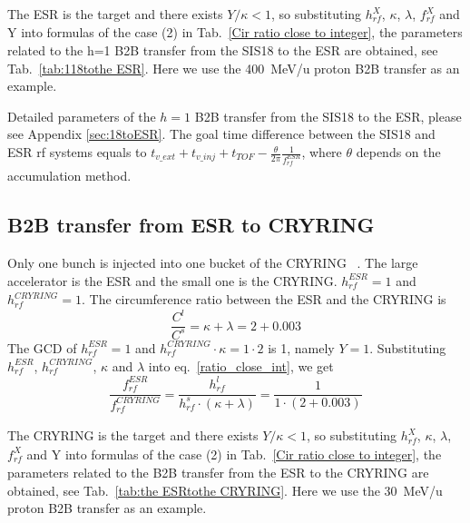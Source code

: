 The ESR is the target and there exists $Y/\kappa<1$, so substituting $h^X_\mathit{rf}$, $\kappa$, $\lambda$, $f_{\mathit{rf}}^{X}$ and Y into formulas of the case (2) in Tab.~\ref{Cir ratio close to integer}, the parameters related to the h=1 B2B transfer from the SIS18 to the ESR are obtained, see Tab.~\ref{tab:118tothe ESR}. Here we use the \SI{400}{MeV/\atomicmassunit} proton B2B transfer as an example. 



Detailed parameters of the $h=1$ B2B transfer from the SIS18 to the ESR, please see Appendix \ref{sec:18toESR}. The goal time difference between the SIS18 and ESR rf systems equals to $t_{v\_ext}+t_{v\_inj}+t_{TOF}-\frac{\theta}{2\pi}\frac{1}{f_\mathit{rf}^\mathit{ESR}}$, where $\theta$ depends on the accumulation method.

\subsection{B2B transfer from ESR to CRYRING}
Only one bunch is injected into one bucket of the CRYRING ~\cite{herfurth_low_2013, lestinsky_cryring_2015}. The large accelerator is the ESR and the small one is the CRYRING. $h^{\mathit{ESR}}_\mathit{rf}=1$ and $h^{\mathit{CRYRING}}_\mathit{rf}=1$. The circumference ratio between the ESR and the CRYRING is
\begin{equation}
\frac{C^l}{C^s}=\kappa + \lambda =2+0.003
\end{equation}
The GCD of $h^{\mathit{ESR}}_\mathit{rf}=1$ and $h^{\mathit{CRYRING}}_\mathit{rf} \cdot \kappa=1\cdot 2$ is 1, namely $Y=1$. Substituting $h^{\mathit{ESR}}_\mathit{rf}$, $h^{\mathit{CRYRING}}_\mathit{rf}$, $\kappa$ and $\lambda$ into eq.~\ref{ratio_close_int}, we get
\begin{equation}
\frac {f_{\mathit{rf}}^{\mathit{ESR}}}{f_{\mathit{rf}}^{\mathit{CRYRING}}}= \frac{h^l_\mathit{rf}}{h^s_\mathit{rf} \cdot (\kappa+ \lambda)}=\frac {1}{1 \cdot(2+0.003)}
\end{equation}

The CRYRING is the target and there exists $Y/\kappa<1$, so substituting $h^X_\mathit{rf}$, $\kappa$, $\lambda$, $f_{\mathit{rf}}^{X}$ and Y into formulas of the case (2) in Tab.~\ref{Cir ratio close to integer}, the parameters related to the B2B transfer from the ESR to the CRYRING are obtained, see Tab.~\ref{tab:the ESRtothe CRYRING}. Here we use the \SI{30}{MeV/\atomicmassunit} proton B2B transfer as an example. 

